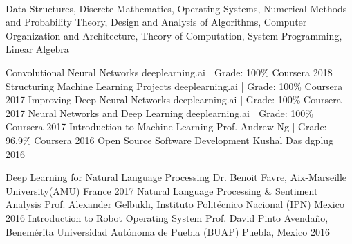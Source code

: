 \\Data Structures, Discrete Mathematics, Operating Systems, Numerical Methods and Probability Theory, Design and Analysis of Algorithms, Computer Organization and Architecture, Theory of Computation, System Programming, Linear Algebra

\begin{cvhonors}
  \cvhonor
    {Convolutional Neural Networks}
    {deeplearning.ai | Grade: 100\%}
    {Coursera}
    {2018}
  \cvhonor
    {Structuring Machine Learning Projects}
    {deeplearning.ai | Grade: 100\%}
    {Coursera}
    {2017}
  \cvhonor
    {Improving Deep Neural Networks}
    {deeplearning.ai | Grade: 100\%}
    {Coursera}
    {2017}
  \cvhonor
    {Neural Networks and Deep Learning}
    {deeplearning.ai | Grade: 100\%}
    {Coursera}
    {2017}
  \cvhonor
    {Introduction to Machine Learning}
    {Prof. Andrew Ng | Grade: 96.9\%}
    {Coursera}
    {2016}
  \cvhonor
    {Open Source Software Development}
    {Kushal Das}
    {dgplug}
    {2016}
\end{cvhonors}

\begin{cvhonors}
  \cvhonor
    {Deep Learning for Natural Language Processing}
    {Dr. Benoit Favre, Aix-Marseille University(AMU)}
    {France}
    {2017}
  \cvhonor
    {Natural Language Processing \& Sentiment Analysis}
    {Prof. Alexander Gelbukh, Instituto Politécnico Nacional (IPN)}
    {Mexico}
    {2016}
  \cvhonor
    {Introduction to Robot Operating System}
    {Prof. David Pinto Avendaño, Benemérita Universidad Autónoma de Puebla (BUAP)}
    {Puebla, Mexico}
    {2016}
\end{cvhonors}

